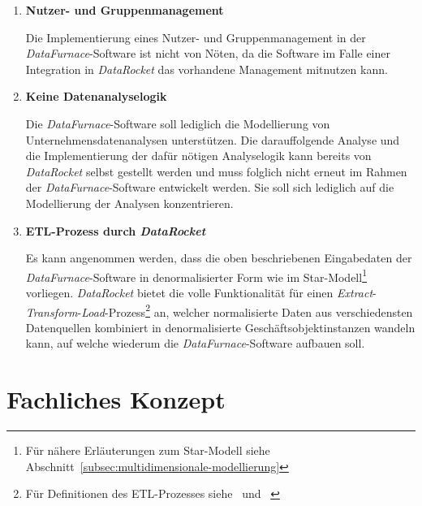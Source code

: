 \documentclass[
  language=german, %
  type=bachelor%
]{isthesis}
\begin{document}
\begin{content}
  \begin{enumerate}
    \item \textbf{Nutzer- und Gruppenmanagement}

		Die Implementierung eines Nutzer- und Gruppenmanagement in der
		\textit{DataFurnace}-Software ist nicht von Nöten, da die Software im
		Falle einer Integration in \textit{DataRocket} das vorhandene Management
		mitnutzen kann.

    \item \textbf{Keine Datenanalyselogik}

      Die \textit{DataFurnace}-Software soll lediglich die Modellierung von
      Unternehmensdatenanalysen unterstützen. Die darauffolgende Analyse und
      die Implementierung der dafür nötigen Analyselogik kann bereits von
      \textit{DataRocket} selbst gestellt werden und muss folglich nicht erneut
      im Rahmen der \textit{DataFurnace}-Software entwickelt werden. Sie soll
      sich lediglich auf die Modellierung der Analysen konzentrieren.

    \item \textbf{\acrshort{ETL}-Prozess durch \textit{DataRocket}}

			Es kann angenommen werden, dass die oben beschriebenen Eingabedaten der
			\textit{DataFurnace}-Software in denormalisierter Form wie im
			Star-Modell\footnote{Für nähere Erläuterungen zum Star-Modell siehe
			Abschnitt~\ref{subsec:multidimensionale-modellierung}} vorliegen.
			\textit{DataRocket} bietet die volle Funktionalität für einen
			\textit{Extract}-\textit{Transform}-\textit{Load}-Prozess\footnote{Für
			Definitionen des ETL-Prozesses
			siehe~\textsc{\citeauthor{vassiliadis2002conceptual}}
			\citeyearpar{vassiliadis2002conceptual}
			und~\textsc{\citeauthor{trujillo2003uml}} \citeyearpar{trujillo2003uml}}
			an, welcher normalisierte Daten aus verschiedensten Datenquellen
			kombiniert in denormalisierte Geschäftsobjektinstanzen wandeln kann, auf
			welche wiederum die \textit{DataFurnace}-Software aufbauen soll.

  \end{enumerate}



  \section{Fachliches Konzept}


\end{content}
\end{document}
